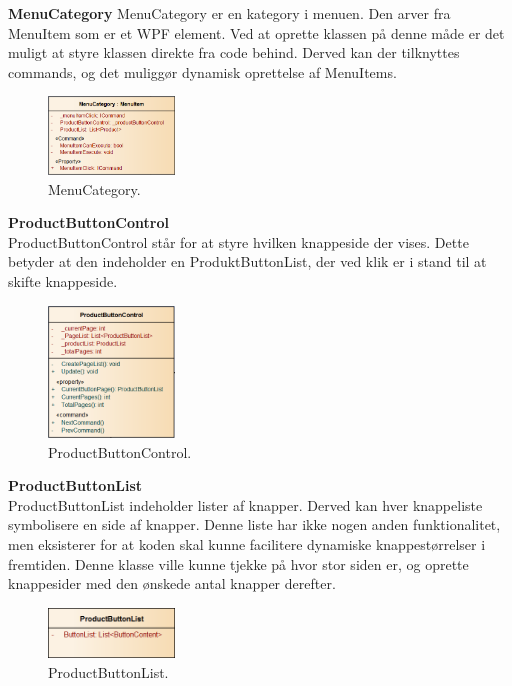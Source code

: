 \textbf{MenuCategory}
MenuCategory er en kategory i menuen. Den arver fra MenuItem som er et WPF element. Ved at oprette klassen på denne måde er det muligt at styre klassen direkte fra code behind. Derved kan der tilknyttes commands, og det muliggør dynamisk oprettelse af MenuItems.


\begin{figure}[H]
	\centering
	\includegraphics[width=0.3\textwidth]{Systemdesign/Frontend/pics/MenuCategory}
	\caption{MenuCategory.}
	\label{fig:PBC}
\end{figure}

\textbf{ProductButtonControl} \\
ProductButtonControl står for at styre hvilken knappeside der vises. Dette betyder at den indeholder en ProduktButtonList, der ved klik er i stand til at skifte knappeside.

\begin{figure}[H]
	\centering
	\includegraphics[width=0.3\textwidth]{Systemdesign/Frontend/pics/ProductButtonControl}
	\caption{ProductButtonControl.}
	\label{fig:PBC}
\end{figure}

\textbf{ProductButtonList} \\
ProductButtonList indeholder lister af knapper. Derved kan hver knappeliste symbolisere en side af knapper. Denne liste har ikke nogen anden funktionalitet, men eksisterer for at koden skal kunne facilitere dynamiske knappestørrelser i fremtiden. Denne klasse ville kunne tjekke på hvor stor siden er, og oprette knappesider med den ønskede antal knapper derefter.


\begin{figure}[H]
	\centering
	\includegraphics[width=0.3\textwidth]{Systemdesign/Frontend/pics/ProductButtonList}
	\caption{ProductButtonList.}
	\label{fig:PBL}
\end{figure}


